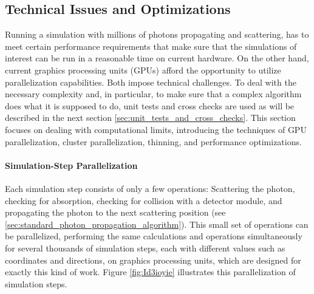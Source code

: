 \subsection{Technical Issues and Optimizations}
\label{sec:technical_issues_and_optimizations}

Running a simulation with millions of photons propagating and
scattering, has to meet certain performance requirements that make sure
that the simulations of interest can be run in a reasonable time on
current hardware. On the other hand, current graphics processing units
(GPUs) afford the opportunity to utilize parallelization capabilities.
Both impose technical challenges. To deal with the necessary complexity
and, in particular, to make sure that a complex algorithm does what it
is supposed to do, unit tests and cross checks are used as will be
described in the next section \ref{sec:unit_tests_and_cross_checks}.
This section focuses on dealing with computational limits, introducing
the techniques of GPU parallelization, cluster parallelization,
thinning, and performance optimizations.

\paragraph{Simulation-Step Parallelization}

Each simulation step consists of only a few operations: Scattering the
photon, checking for absorption, checking for collision with a detector
module, and propagating the photon to the next scattering position (see
\ref{sec:standard_photon_propagation_algorithm}). This small set of
operations can be parallelized, performing the same calculations and
operations simultaneously for several thousands of simulation steps,
each with different values such as coordinates and directions, on
graphics processing units, which are designed for exactly this kind of
work. Figure \ref{fig:Id3ioyie} illustrates this parallelization of
simulation steps.

